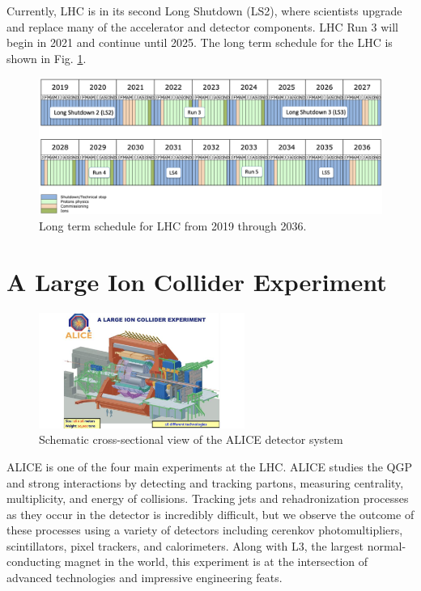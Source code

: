 Currently, LHC is in its second Long Shutdown (LS2), where scientists upgrade and replace many of the accelerator and detector components. LHC Run 3 will begin in 2021 and continue until 2025. The long term schedule for the LHC is shown in Fig. \ref{fig:CERN_Timelne}.
\begin{figure}[H]
    \centering
    \includegraphics[width=\textwidth]{figures/CERN/LHC_Timeline.png}
    \caption{Long term schedule for LHC from 2019 through 2036.}
    \label{fig:CERN_Timelne}
\end{figure}

\section{A Large Ion Collider Experiment}

\begin{figure}[H]
    \centering
    \includegraphics[width=0.6\textwidth]{figures/ALICE/alice_detector.jpg}
    \caption{Schematic cross-sectional view of the ALICE detector system}
    \label{fig:ALICE_DETECTOR}
\end{figure}

ALICE is one of the four main experiments at the LHC. ALICE studies the QGP and strong interactions by detecting and tracking partons, measuring centrality, multiplicity, and energy of collisions. Tracking jets and rehadronization processes as they occur in the detector is incredibly difficult, but we observe the outcome of these processes using a variety of detectors including cerenkov photomultipliers, scintillators, pixel trackers, and calorimeters. Along with L3, the largest normal-conducting magnet in the world, this experiment is at the intersection of advanced technologies and impressive engineering feats. 


